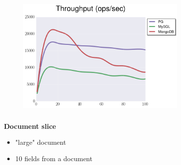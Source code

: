 \documentclass[usenames,dvipsnames, 18pt, compress, aspectratio=169]{beamer}
\begin{document}
\fontsize{17pt}{19}\selectfont
{}

\begin{frame}
    \frametitle{}
    \begin{center}
    \begin{figure}
        \includegraphics[width=0.75\textwidth,center]{benchmarks/select_slice_1_btree_throughput.png}
    \end{figure}
    \end{center}
\end{frame}

\begin{frame}
    \frametitle{}
    \begin{center}
        \textbf{Document slice}
        \begin{itemize}[label={}]
            \item "large" document
            \item 10 fields from a document
        \end{itemize}
    \end{center}
\end{frame}
\end{document}
